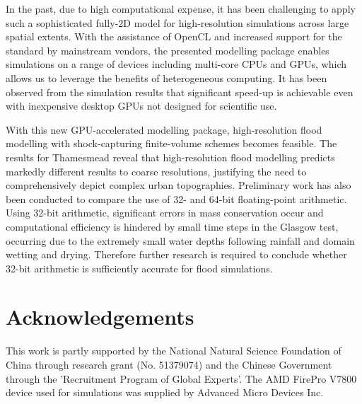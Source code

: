 \documentclass[11pt,english,a4paper]{article}
\begin{document}
In the past, due to high computational expense, it has been challenging to apply such a sophisticated fully-2D model for high-resolution simulations across large spatial extents. With the assistance of OpenCL and increased support for the standard by mainstream vendors, the presented modelling package enables simulations on a range of devices including multi-core CPUs and GPUs, which allows us to leverage the benefits of heterogeneous computing. It has been observed from the simulation results that significant speed-up is achievable even with inexpensive desktop GPUs not designed for scientific use. 

With this new GPU-accelerated modelling package, high-resolution flood modelling with shock-capturing finite-volume schemes becomes feasible. The results for Thamesmead reveal that high-resolution flood modelling predicts markedly different results to coarse resolutions, justifying the need to comprehensively depict complex urban topographies. Preliminary work has also been conducted to compare the use of 32- and 64-bit floating-point arithmetic. Using 32-bit arithmetic, significant errors in mass conservation occur and computational efficiency is hindered by small time steps in the Glasgow test, occurring due to the extremely small water depths following rainfall and domain wetting and drying. Therefore further research is required to conclude whether 32-bit arithmetic is sufficiently accurate for flood simulations.

\section*{Acknowledgements}
This work is partly supported by the National Natural Science Foundation of China through research grant (No. 51379074) and the Chinese Government through the 'Recruitment Program of Global Experts'. The AMD FirePro V7800 device used for simulations was supplied by Advanced Micro Devices Inc.



\end{document}
